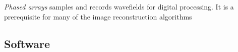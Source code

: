 \emph{Phased arrays} samples and records wavefields for digital processing. It is a prerequisite for many of the image reconstruction algorithms



\subsection{Software}


% 
% 
% 
% 
% 
% 
% 
% 
% 
% 
% 
% 
% 
% 
% 
% 
